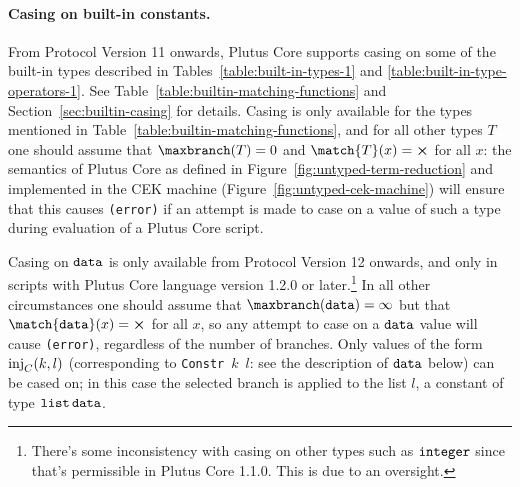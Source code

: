 \paragraph{Casing on built-in constants.}
From Protocol Version 11 onwards, Plutus Core supports casing on some of the
built-in types described in Tables~\ref{table:built-in-types-1} and
\ref{table:built-in-type-operators-1}.  See Table~\ref{table:builtin-matching-functions}
and Section~\ref{sec:builtin-casing} for details.  Casing is only available for
the types mentioned in Table~\ref{table:builtin-matching-functions}, and for all
other types $T$ one should assume that $\maxbranch(T) = 0$ and $\match{T}(x)
= \errorX$ for all $x$: the semantics of Plutus Core as defined in
Figure~\ref{fig:untyped-term-reduction} and implemented in the CEK machine
(Figure~\ref{fig:untyped-cek-machine}) will ensure that this
causes \texttt{(error)} if an attempt is made to case on a value of such a type
during evaluation of a Plutus Core script.

\medskip
Casing on $\mathtt{data}$ is only available from Protocol Version 12 onwards, and
only in scripts with Plutus Core language version 1.2.0 or
later.\footnote{There's some inconsistency with casing on other types such as
$\mathtt{integer}$ since that's permissible in Plutus Core 1.1.0.  This is due to an
oversight.} In all other circumstances one should assume that
$\maxbranch(\ty{data}) = \infty$ but that $\match{\ty{data}}(x) = \errorX$ for
all $x$, so any attempt to case on a $\mathtt{data}$ value will
cause \texttt{(error)}, regardless of the number of branches.  Only values of
the form $\operatorname{inj}_C(k,l)$ (corresponding to \texttt{Constr}~$k$~$l$: see the
description of $\mathtt{data}$ below) can be cased on; in this case the selected
branch is applied to the list $l$, a constant of type $\mathtt{list}\,\mathtt{data}$.

